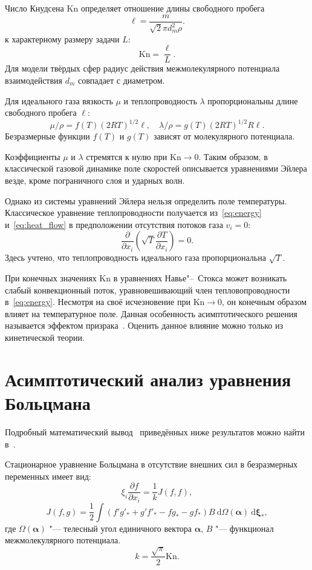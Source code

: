 \documentclass[english,russian,a4paper,12pt]{article}
\newcommand{\Kn}{\mathrm{Kn}}
\newcommand{\dd}{\:\mathrm{d}}
\newcommand{\pder}[2][]{\frac{\partial#1}{\partial#2}}
\begin{document}
Число Кнудсена \(\Kn\) определяет отношение длины свободного пробега
\begin{equation}\label{eq:ell}
	\ell = \frac{m}{\sqrt2\pi d_m^2 \rho}.
\end{equation}
к характерному размеру задачи \(L\):
\begin{equation}\label{eq:Knudsen}
	\Kn = \frac{\ell}L.
\end{equation}
Для модели твёрдых сфер радиус действия межмолекулярного потенциала взаимодействия \(d_m\)
совпадает с диаметром.

Для идеального газа вязкость \(\mu\) и теплопроводность \(\lambda\)
пропорциональны длине свободного пробега \(\ell\):
\[ \mu/\rho = f(T)(2RT)^{1/2}\ell, \quad \lambda/\rho = g(T)(2RT)^{1/2}R\ell. \]
Безразмерные функции \(f(T)\) и \(g(T)\) зависят от молекулярного потенциала.

Коэффициенты \(\mu\) и \(\lambda\) стремятся к нулю при \(\Kn\to0\).
Таким образом, в классической газовой динамике поле скоростей описывается уравнениями Эйлера везде,
кроме пограничного слоя и ударных волн.

Однако из системы уравнений Эйлера нельзя определить поле температуры.
Классическое уравнение теплопроводности получается из~\eqref{eq:energy} и~\eqref{eq:heat_flow}
в предположении отсутствия потоков газа \(v_i = 0\):
\begin{equation}\label{eq:heat_equation}
	\pder{x_i}\left(\sqrt{T}\pder[T]{x_i}\right) = 0.
\end{equation}
Здесь учтено, что теплопроводность идеального газа пропорциональна \(\sqrt{T}\).

При конечных значениях \(\Kn\) в уравнениях Навье"--~Стокса может возникать слабый конвекционный поток,
уравновешивающий член тепловопроводности в~\eqref{eq:energy}.
Несмотря на своё исчезновение при \(\Kn\to0\), он конечным образом влияет на температурное поле.
Данная особенность асимптотического решения называется эффектом призрака~\cite{Sone2002, Sone2007}.
Оценить данное влияние можно только из кинетической теории.

\section{Асимптотический анализ уравнения Больцмана}
Подробный математический вывод~\cite{Bobylev1996} приведённых ниже результатов можно найти в~\cite{Sone2002}.

Стационарное уравнение Больцмана в отсутствие внешних сил в безразмерных переменных имеет вид:
\begin{equation}\label{eq:Boltzmann}
	\xi_i\pder[f]{x_i} = \frac1k J(f,f),
\end{equation}
\begin{equation}\label{eq:integral}
	J(f,g) = \frac12 \int(f'g'_*+g'f'_*-fg_*-gf_*)B\dd\Omega(\boldsymbol\alpha)\dd \boldsymbol\xi_*,
\end{equation}
где \(\Omega(\boldsymbol{\alpha})\) "--- телесный угол единичного вектора \(\boldsymbol\alpha\),
\(B\) "--- функционал межмолекулярного потенциала.
\[ k = \frac{\sqrt\pi}2\Kn.\]
\end{document}
